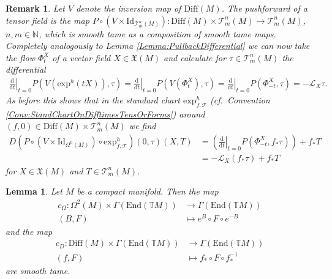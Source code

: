 \documentclass[10pt,a4paper]{amsart}
\newtheorem{lemma}{Lemma}
\newtheorem{remark}{Remark}
\newcommand{\Diff}{\mathrm{Diff}(M)}
\newcommand{\Forms}[1]{\Omega^{#1}(M)}
\newcommand{\GenTM}{\mathbb TM}
\newcommand{\LieD}{\mathcal{L}}
\newcommand{\N}{\mathbb{N}}
\newcommand{\VFs}{\mathfrak{X}(M)}
\renewcommand{\d}{\mathrm{d}}
\newcommand{\eh}[1]{\mathrm{exp}^h(#1)}
\newcommand{\exh}{\mathrm{exp}^h}
\newcommand{\tensf}[2]{\mathcal{T}^{#1}_{#2}(M)}
\begin{document}
\begin{remark}
\label{Rem:PushForwDifferential}
Let $V$ denote the inversion map of $\Diff$. The pushforward of a tensor field is the map $P\circ (V\times \mathrm{Id}_{\tensf{n}{m}}):\Diff\times \tensf{n}{m}\to \tensf{n}{m}$, $n,m\in \N$, which is smooth tame as a composition of smooth tame maps. 
Completely analogously to Lemma \ref{Lemma:PullbackDifferential} we can now take the flow $\Phi_t^X$ of a vector field $X\in \VFs$ and calculate for $\tau \in \tensf{n}{m}$ the differential
\begin{align*}
    \left.\frac{\d}{\d t}\right|_{t=0}P(V(\eh{tX}),\tau)=\left.\frac{\d}{\d t}\right|_{t=0}P(V(\Phi_t^X),\tau)=\left.\frac{\d}{\d t}\right|_{t=0}P(\Phi_{-t}^X,\tau)=-\LieD_X\tau.
\end{align*}
As before this shows that in the standard chart $\exh_{f,\mathcal T}$ (cf.~Convention \ref{Conv:StandChartOnDifftimesTensOrForms}) around $(f,0)\in \Diff\times \tensf{n}{m}$ we find
\begin{align*}
    D(P\circ (V\times \mathrm{Id}_{\Forms{n}})\circ \exh_{f,\mathcal T})(0,\tau)(X,T)&=\left(\left.\frac{\d}{\d t}\right|_{t=0}P(\Phi_{-t}^X,f_*\tau)\right)+f_*T\\
    &=-\LieD_X(f_*\tau)+f_*T
\end{align*}
for $X\in \VFs$ and $T\in \tensf{n}{m}$.
\end{remark}

\begin{lemma}
Let $M$ be a compact manifold. Then the map 
\begin{align*}
    c_\Omega:\Forms{2}\times \Gamma(\mathrm{End}(\GenTM))&\longrightarrow \Gamma(\mathrm{End}(\GenTM))\\
    (B,F)&\longmapsto e^B\circ F\circ e^{-B} 
\end{align*}
and the map
\begin{align*}
    c_D:\Diff\times \Gamma(\mathrm{End}(\GenTM))&\longrightarrow \Gamma(\mathrm{End}(\GenTM))\\
    (f,F)&\longmapsto f_*\circ F\circ f_*^{-1}
\end{align*}
are smooth tame.
\end{lemma}
\end{document}
